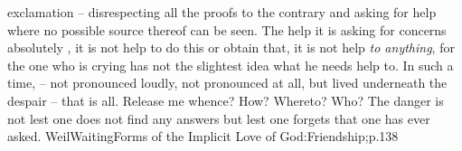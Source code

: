 exclamation -- disrespecting all the  proofs to the contrary and
asking for help where no possible source thereof can be seen.  The help it is
asking for concerns absolutely , it is not help to do this or obtain
that, it is not help {\em to anything}, for the one who is crying has not the
slightest idea what he needs help to. In such a time, 
 -- not pronounced
loudly, not pronounced at all, but lived underneath the despair --
that is all.  Release me whence? How? Whereto? Who? %
The danger is not lest one does not find any answers but lest one forgets that
one has ever asked.  \citet{The danger is not lest the soul should doubt whether
  there is any bread, but lest, by a lie, it should persuade itself that it is
  not hungry.}{WeilWaiting}{Forms of the Implicit Love of God:Friendship;p.138}

